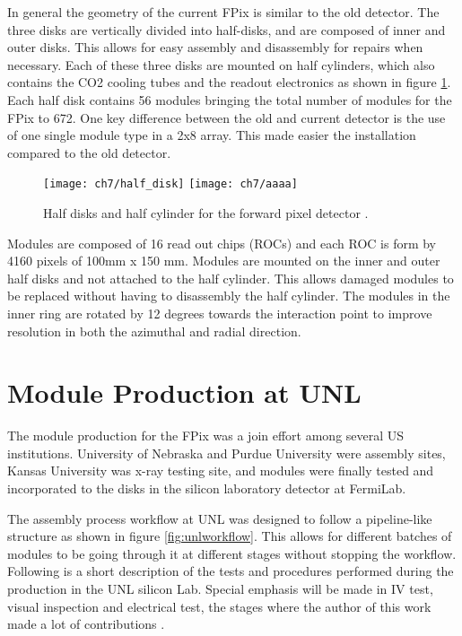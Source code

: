 
In general the geometry of the current FPix is similar to the old detector. The three disks are vertically divided into half-disks, and are composed of inner and outer disks. This allows for easy assembly and disassembly for repairs when necessary. Each of these three disks are mounted on half cylinders, which also contains the CO2 cooling tubes and the readout electronics as shown in figure \ref{halfdisk}. Each half disk contains 56 modules bringing the total number of modules for the FPix to 672. One key difference between the old and current detector is the use of one single module type in a 2x8 array. This made easier the installation compared to the old detector.   

\begin{figure}[!h]
	\centering
	\texttt{[image: ch7/half\_disk]}
	\texttt{[image: ch7/aaaa]}
	\caption[Half disks and half cylinder]{Half disks and half cylinder for the forward pixel detector \cite{pix_tdr}.}
	\label{halfdisk}
\end{figure}
Modules are composed of 16 read out chips (ROCs) and each ROC is form by 4160 pixels of 100mm x 150 mm. {}
Modules are mounted on the inner and outer half disks and not attached to the half cylinder. This allows damaged modules to be replaced without having to disassembly the half cylinder. The modules in the inner ring are rotated by 12 degrees towards the interaction point to improve resolution in both the azimuthal and radial direction.

\section{Module Production at UNL}
The module production for the FPix was a join effort among several US institutions. University of Nebraska and Purdue University were assembly sites, Kansas University was x-ray testing site, and modules were finally tested and incorporated to the disks in the silicon laboratory detector at FermiLab.

The assembly process workflow at UNL was designed to follow a pipeline-like structure as shown in figure \ref{fig:unlworkflow}. This allows for different batches of modules to be going through it at different stages without stopping the workflow. Following is a short description of the tests and procedures performed during the production in the UNL silicon Lab. Special emphasis will be made in IV test, visual inspection and electrical test, the stages where the author of this work made a lot of contributions {}. 

